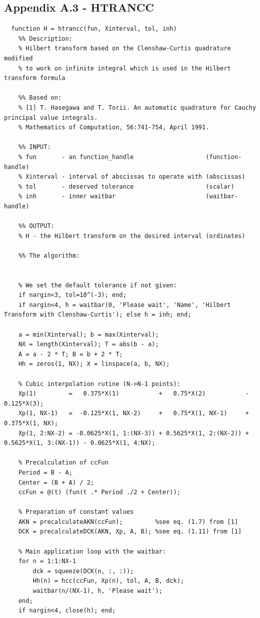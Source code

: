 \documentclass[12pt,twoside,a4paper]{article}
\numberwithin{equation}{subsection}
\numberwithin{figure}{subsection}
\begin{document}
\subsection*{Appendix A.3 - HTRANCC}
\begin{lstlisting}
  function H = htrancc(fun, Xinterval, tol, inh)
    %% Description:
    % Hilbert transform based on the Clenshaw-Curtis quadrature modified
    % to work on infinite integral which is used in the Hilbert transform formula

    %% Based on:
    % [1] T. Hasegawa and T. Torii. An automatic quadrature for Cauchy principal value integrals. 
    % Mathematics of Computation, 56:741-754, April 1991.
      
    %% INPUT:
    % fun       - an function_handle                    (function-handle) 
    % Xinterval - interval of abscissas to operate with (abscissas)
    % tol       - deserved tolerance                    (scalar)
    % inh       - inner waitbar                         (waitbar-handle)
     
    %% OUTPUT:
    % H - the Hilbert transform on the desired interval (ordinates)

    %% The algorithm:

  
    % We set the default tolerance if not given:
    if nargin<3, tol=10^(-3); end;
    if nargin<4, h = waitbar(0, 'Please wait', 'Name', 'Hilbert Transform with Clenshaw-Curtis'); else h = inh; end;

    a = min(Xinterval); b = max(Xinterval); 
    NX = length(Xinterval); T = abs(b - a);
    A = a - 2 * T; B = b + 2 * T;
    Hh = zeros(1, NX); X = linspace(a, b, NX);

    % Cubic interpolation rutine (N->N-1 points):
    Xp(1)         =   0.375*X(1)           +   0.75*X(2)           -  0.125*X(3);
    Xp(1, NX-1)   =  -0.125*X(1, NX-2)     +   0.75*X(1, NX-1)     +  0.375*X(1, NX);
    Xp(1, 2:NX-2) = -0.0625*X(1, 1:(NX-3)) + 0.5625*X(1, 2:(NX-2)) + 0.5625*X(1, 3:(NX-1)) - 0.0625*X(1, 4:NX);

    % Precalculation of ccFun
    Period = B - A;
    Center = (B + A) / 2;
    ccFun = @(t) (fun(t .* Period ./2 + Center));

    % Preparation of constant values
    AKN = precalculateAKN(ccFun);         %see eq. (1.7) from [1]
    DCK = precalculateDCK(AKN, Xp, A, B); %see eq. (1.11) from [1]

    % Main application loop with the waitbar:
    for n = 1:1:NX-1
        dck = squeeze(DCK(n, :, :));
        Hh(n) = hcc(ccFun, Xp(n), tol, A, B, dck); 
        waitbar(n/(NX-1), h, 'Please wait');
    end;
    if nargin<4, close(h); end;


\end{lstlisting}
\end{document}
